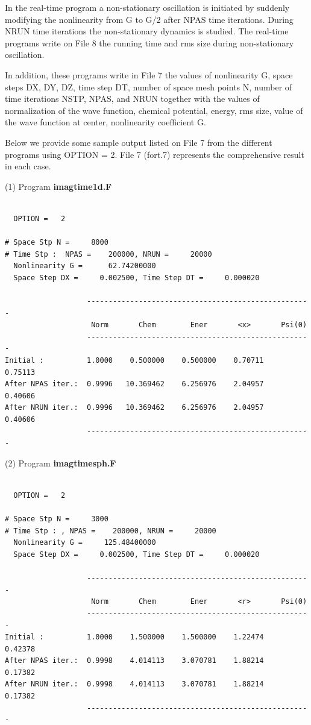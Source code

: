 \documentclass[onecolumn]{elsart3p}
\begin{document}
In the real-time program a non-stationary oscillation is initiated by suddenly
modifying the nonlinearity from G to G/2 after NPAS time iterations. During NRUN
time iterations the non-stationary dynamics is studied. The real-time programs
write on File 8  the running time and  rms size during non-stationary
oscillation.



In addition, these programs write in File 7 the values of nonlinearity G, space
steps DX, DY, DZ,  time step DT, number of space mesh points N,  number of time
iterations NSTP, NPAS, and NRUN together with the values of normalization of the
wave function, chemical potential, energy, rms size, value of the wave function
at center, nonlinearity coefficient G.



Below we provide some sample output listed on File 7 from the different programs
using OPTION = 2. File 7 (fort.7) represents the comprehensive result in each
case.


(1)  Program {\bf imagtime1d.F}

\begin{verbatim}

  OPTION =   2

# Space Stp N =     8000
# Time Stp :  NPAS =    200000, NRUN =     20000
  Nonlinearity G =      62.74200000
  Space Step DX =     0.002500, Time Step DT =     0.000020

                   ----------------------------------------------------
                    Norm       Chem        Ener       <x>       Psi(0)
                   ----------------------------------------------------
Initial :          1.0000    0.500000    0.500000    0.70711    0.75113
After NPAS iter.:  0.9996   10.369462    6.256976    2.04957    0.40606
After NRUN iter.:  0.9996   10.369462    6.256976    2.04957    0.40606
                   ----------------------------------------------------

\end{verbatim}
(2)  Program {\bf imagtimesph.F}

\begin{verbatim}

  OPTION =   2

# Space Stp N =     3000
# Time Stp : , NPAS =    200000, NRUN =     20000
  Nonlinearity G =     125.48400000
  Space Step DX =     0.002500, Time Step DT =     0.000020

                   ----------------------------------------------------
                    Norm       Chem        Ener       <r>       Psi(0)
                   ----------------------------------------------------
Initial :          1.0000    1.500000    1.500000    1.22474    0.42378
After NPAS iter.:  0.9998    4.014113    3.070781    1.88214    0.17382
After NRUN iter.:  0.9998    4.014113    3.070781    1.88214    0.17382
                   ----------------------------------------------------
\end{verbatim}
\end{document}
